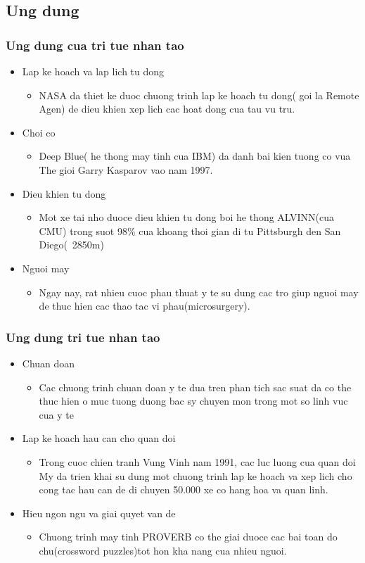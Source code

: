 \documentclass[12pt]{beamer}
\begin{document}
\subsection{Ung dung}
\begin{frame}
\frametitle{Ung dung cua tri tue nhan tao}
\begin{itemize}
\item Lap ke hoach va lap lich tu dong
\begin{itemize}
\item NASA da thiet ke duoc chuong trinh lap ke hoach tu dong( goi la Remote Agen) de dieu khien xep lich cac hoat dong cua tau vu tru.
\end{itemize}
\item Choi co
\begin{itemize}
\item Deep Blue( he thong may tinh cua IBM) da danh bai kien tuong co vua The gioi Garry Kasparov vao nam 1997.
\end{itemize}
\item Dieu khien tu dong
\begin{itemize}
\item Mot xe tai nho duoce dieu khien tu dong boi he thong ALVINN(cua CMU) trong suot 98\% cua khoang thoi gian di tu Pittsburgh den San Diego(~2850m) 
\end{itemize}
\item Nguoi may
\begin{itemize}
\item Ngay nay, rat nhieu cuoc phau thuat y te su dung cac tro giup nguoi may de thuc hien cac thao tac vi phau(microsurgery).
\end{itemize}
\end{itemize}
\end{frame}
\begin{frame}
\frametitle{Ung dung tri tue nhan tao}
\begin{itemize}
\item Chuan doan
\begin{itemize}
\item Cac chuong trinh chuan doan y te dua tren phan tich sac suat da co the thuc hien o muc tuong duong bac sy chuyen mon trong mot so linh vuc cua y te
\end{itemize}
\item Lap ke hoach hau can cho quan doi
\begin{itemize}
\item Trong cuoc chien tranh Vung Vinh nam 1991, cac luc luong cua quan doi My da trien khai su dung mot chuong trinh lap ke hoach va xep lich cho cong tac hau can de di chuyen 50.000 xe co hang hoa va quan linh.
\end{itemize}
\item Hieu ngon ngu va giai quyet van de
\begin{itemize}
\item Chuong trinh may tinh PROVERB co the giai duoce cac bai toan do chu(crossword puzzles)tot hon kha nang cua nhieu nguoi.
\end{itemize}
\end{itemize}
\end{frame}
\end{document}
